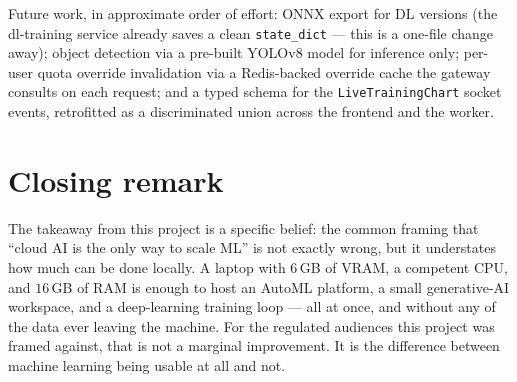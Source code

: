 \documentclass[12pt, a4paper, oneside]{report}
\begin{document}
Future work, in approximate order of effort: ONNX export for DL
versions (the dl-training service already saves a clean
\texttt{state\_dict} --- this is a one-file change away); object
detection via a pre-built YOLOv8 model for inference only; per-user
quota override invalidation via a Redis-backed override cache the
gateway consults on each request; and a typed schema for the
\texttt{LiveTrainingChart} socket events, retrofitted as a
discriminated union across the frontend and the worker.

\section*{Closing remark}

The takeaway from this project is a specific belief: the common
framing that ``cloud AI is the only way to scale ML'' is not exactly
wrong, but it understates how much can be done locally. A laptop
with $6$\,GB of VRAM, a competent CPU, and $16$\,GB of RAM is enough
to host an AutoML platform, a small generative-AI workspace, and a
deep-learning training loop --- all at once, and without any of the
data ever leaving the machine. For the regulated audiences this
project was framed against, that is not a marginal improvement. It
is the difference between machine learning being usable at all and
not.
\end{document}
